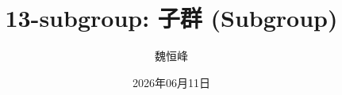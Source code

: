 \documentclass[]{beamer}
\title[13-group: 子群]{13-subgroup: 子群 (Subgroup)}
\author[魏恒峰]{\large 魏恒峰}
\institute{hfwei@hnu.edu.cn}
\date{2026年06月11日}
\begin{document}
\maketitle






\thankyou{}

\end{document}
